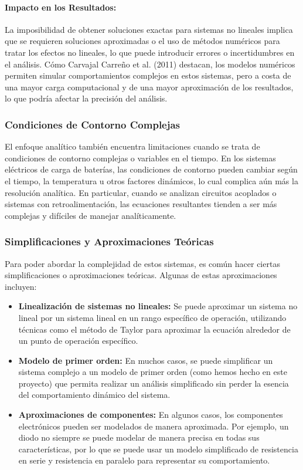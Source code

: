 \paragraph*{Impacto en los Resultados:}
La imposibilidad de obtener soluciones exactas para sistemas no lineales implica que
se requieren soluciones aproximadas o el uso de métodos numéricos para tratar los
efectos no lineales, lo que puede introducir errores o incertidumbres en el análisis.
Cómo Carvajal Carreño et al. (2011) destacan, los modelos numéricos permiten
simular comportamientos complejos en estos sistemas, pero a costa de una mayor
carga computacional y de una mayor aproximación de los resultados, lo que podría
afectar la precisión del análisis.

\subsubsection*{Condiciones de Contorno Complejas}
El enfoque analítico también encuentra limitaciones cuando se trata de condiciones de
contorno complejas o variables en el tiempo. En los sistemas eléctricos de carga de baterías,
las condiciones de contorno pueden cambiar según el tiempo, la temperatura u otros factores
dinámicos, lo cual complica aún más la resolución analítica. En particular, cuando se analizan
circuitos acoplados o sistemas con retroalimentación, las ecuaciones resultantes tienden a ser
más complejas y difíciles de manejar analíticamente.

\subsubsection*{Simplificaciones y Aproximaciones Teóricas}
Para poder abordar la complejidad de estos sistemas, es común hacer ciertas simplificaciones
o aproximaciones teóricas. Algunas de estas aproximaciones incluyen:

\begin{itemize}
    \item \textbf{Linealización de sistemas no lineales:} Se puede aproximar un sistema no lineal por un sistema lineal en un rango específico de operación, utilizando técnicas como el método de Taylor para aproximar la ecuación alrededor de un punto de operación específico.

    \item \textbf{Modelo de primer orden:} En muchos casos, se puede simplificar un sistema complejo a un modelo de primer orden (como hemos hecho en este proyecto) que permita realizar un análisis simplificado sin perder la esencia del comportamiento dinámico del sistema.

    \item \textbf{Aproximaciones de componentes:} En algunos casos, los componentes electrónicos pueden ser modelados de manera aproximada. Por ejemplo, un diodo no siempre se puede modelar de manera precisa en todas sus características, por lo que se puede usar un modelo simplificado de resistencia en serie y resistencia en paralelo para representar su comportamiento.
\end{itemize}

